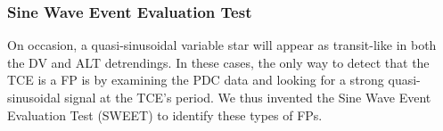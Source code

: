 

%





\subsubsection{Sine Wave Event Evaluation Test}
\label{s:sweetntl}

On occasion, a quasi-sinusoidal variable star will appear as transit-like in both the DV and ALT detrendings. In these cases, the only way to detect that the TCE is a FP is by examining the PDC data and looking for a strong quasi-sinusoidal signal at the TCE's period. We thus invented the Sine Wave Event Evaluation Test (SWEET) to identify these types of FPs.

